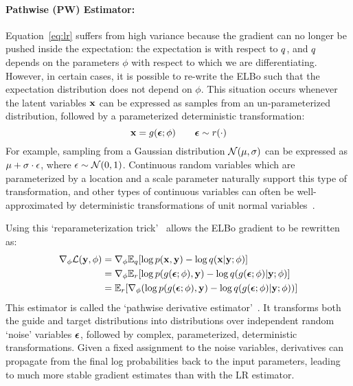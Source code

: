 \paragraph{Pathwise (PW) Estimator:}

Equation~\ref{eq:lr} suffers from high variance because the gradient can no longer be pushed inside the expectation: the expectation is with respect to $q$, and $q$ depends on the parameters $\phi$ with respect to which we are differentiating.
However, in certain cases, it is possible to re-write the ELBo such that the expectation distribution does not depend on $\phi$.
This situation occurs whenever the latent variables $\mathbf{x}$ can be expressed as samples from an un-parameterized distribution, followed by a parameterized deterministic transformation:
\begin{equation*}
\mathbf{x} = g(\bm{\epsilon} ; \phi) \hspace{2em} \bm{\epsilon} \sim r(\cdot)
\end{equation*}
For example, sampling from a Gaussian distribution $\mathcal{N}(\mu, \sigma)$ can be expressed as $\mu + \sigma \cdot \epsilon$, where $\epsilon \sim \mathcal{N}(0, 1)$. Continuous random variables which are parameterized by a location and a scale parameter naturally support this type of transformation, and other types of continuous variables can often be well-approximated by deterministic transformations of unit normal variables~\cite{ADVI}.

Using this `reparameterization trick'~\cite{AEVB} allows the ELBo gradient to be rewritten as:
\begin{align}
\begin{split}
\nabla_\phi \mathcal{L}(\mathbf{y}, \phi)
&= \nabla_\phi \mathbb{E}_{q}[ \log p(\mathbf{x}, \mathbf{y}) - \log q(\mathbf{x} | \mathbf{y} ; \phi) ]\\
&= \nabla_\phi \mathbb{E}_{r} [ \log p(g(\bm{\epsilon} ; \phi), \mathbf{y}) - \log q(g(\bm{\epsilon} ; \phi) | \mathbf{y} ; \phi) ]\\
&= \mathbb{E}_{r} [\nabla_\phi ( \log p(g(\bm{\epsilon} ; \phi), \mathbf{y}) - \log q(g(\bm{\epsilon} ; \phi) | \mathbf{y} ; \phi) ) ]
\end{split}
\label{eq:pw}
\end{align}
This estimator is called the `pathwise derivative estimator'~\cite{PathwiseEstimator}.
It transforms both the guide and target distributions into distributions over independent random `noise' variables $\bm{\epsilon}$, followed by complex, parameterized, deterministic transformations. Given a fixed assignment to the noise variables, derivatives can propagate from the final log probabilities back to the input parameters, leading to much more stable gradient estimates than with the LR estimator.

